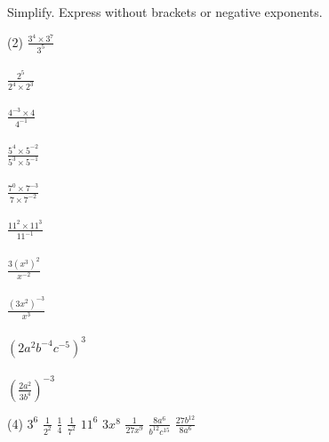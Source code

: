 \documentclass[12pt,fleqn]{book}
\newcommand{\prb}[1]{\begin{Exercise}#1\end{Exercise}}
\newcommand{\sol}[1]{\begin{Answer}#1\end{Answer}}
\begin{document}
\prb{
    Simplify. Express without brackets or negative exponents.\\
    \begin{tasks}(2)
        \task $\displaystyle \frac{3^{4} \times 3^{7}}{3^{5}}$\\
        \\[1in]
        \task $\displaystyle \frac{2^{5}}{2^{4} \times 2^{3}}$\\
        \\[1in]
        \task $\displaystyle \frac{4^{-3} \times 4}{4^{-1}}$\\
        \\[1in]
        \task $\displaystyle \frac{5^{4} \times 5^{-2}}{5^{3} \times 5^{-1}}$\\
        \\[1in]
        \task $\displaystyle \frac{7^{0} \times 7^{-3}}{7 \times 7^{-2}}$\\
        \\[1in]
        \task $\displaystyle \frac{11^{2} \times 11^{3}}{11^{-1}}$\\
        \\[1in]
        \task $\displaystyle \frac{3\left(x^{3}\right)^{2}}{x^{-2}}$\\
        \\[1in]
        \task $\displaystyle \frac{\left(3 x^{2}\right)^{-3}}{x^{3}}$\\
        \\[1in]
        \task $\displaystyle \left(2 a^{2} b^{-4} c^{-5}\right)^{3}$\\
        \\[1in]
        \task $\displaystyle \left(\frac{2 a^{2}}{3 b^{4}}\right)^{-3}$
        \\[1in]
    \end{tasks}
}
\sol{
\begin{tasks}(4)
\task $3^6$
\task $\frac{1}{2^2}$
\task $\frac{1}{4}$
\task 1
\task $\frac{1}{7^2}$
\task $11^6$
\task $3 x^8$
\task $\frac{1}{27 x^9}$
\task $\frac{8 a^6}{b^{12} c^{15}}$
\task $\frac{27 b^{12}}{8 a^6}$
\end{tasks}
}
\end{document}
